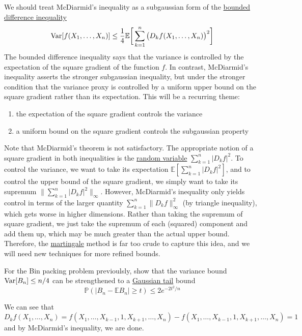   We should treat McDiarmid's inequality as a subgaussian form of the \hyperref[prob-thm:bounded-difference-inequality]{bounded difference inequality} 
  \begin{equation}
    \operatorname{Var}[ f(X_1, \ldots, X_n)] \leq \frac{1}{4} \mathbb{E} \bigg[ \sum_{k=1}^n \big(D_k f (X_1, \ldots, X_n)\big)^2 \bigg]
  \end{equation}
  The bounded difference inequality says that the variance is controlled by the expectation of the square gradient of the function $f$. In contrast, McDiarmid's inequality asserts the stronger subgaussian inequality, but under the stronger condition that the variance proxy is controlled by a uniform upper bound on the square gradient rather than its expectation. This will be a recurring theme: 
  \begin{enumerate}
      \item the expectation of the square gradient controls the variance 
      \item a uniform bound on the square gradient controls the subgaussian property
  \end{enumerate}
  Note that McDiarmid's theorem is not satisfactory. The appropriate notion of a square gradient in both inequalities is the \hyperref[prob-def:random-variable]{random variable} $\sum_{k=1}^n |D_k f|^2$. To control the variance, we want to take its expectation $\mathbb{E} [\sum_{k=1}^n |D_k f|^2]$, and to control the upper bound of the square gradient, we simply want to take its supremum $\| \sum_{k=1}^n |D_k f|^2\|_\infty$. However, McDiarmid's inequality only yields control in terms of the larger quantity $\sum_{k=1}^n \| D_k f\|^2_\infty$ (by triangle inequality), which gets worse in higher dimensions. Rather than taking the supremum of square gradient, we just take the supremum of each (squared) component and add them up, which may be much greater than the actual upper bound. Therefore, the \hyperref[sp-def:martingale]{martingale} method is far too crude to capture this idea, and we will need new techniques for more refined bounds. 

  \begin{exercise}
  For the Bin packing problem previoulsly, show that the variance bound $\operatorname{Var}[B_n] \leq n/4$ can be strengthened to a \hyperref[prob-thm:gaussian-tail-inequality]{Gaussian tail} bound 
  \begin{equation}
    \mathbb{P}(|B_n - \mathbb{E} B_n| \geq t) \leq 2e^{-2t^2/n}
  \end{equation}
  \end{exercise}
  \begin{solution}
  We can see that 
  \begin{equation}
    D_k f(X_1, \ldots, X_n) = f(X_1, \ldots, X_{k-1}, 1, X_{k+1}, \ldots, X_n) - f(X_1, \ldots, X_{k-1}, 1, X_{k+1}, \ldots, X_n) = 1
  \end{equation}
  and by McDiarmid's inequality, we are done. 
  \end{solution}

